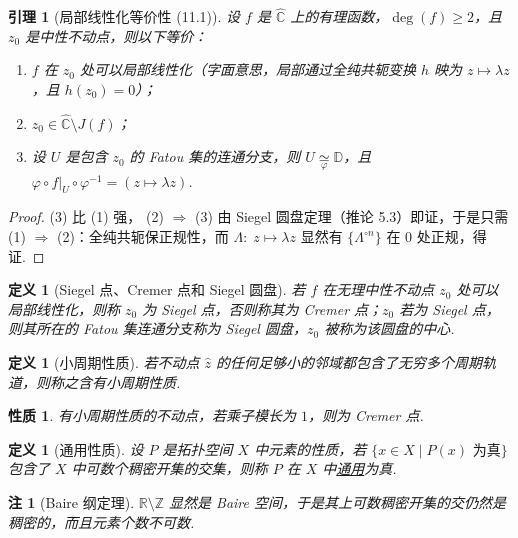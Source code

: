 \documentclass[11pt, a4paper, oneside]{ctexart}
\newtheorem{definition}[theorem]{定义}
\newtheorem{lemma}[theorem]{引理}
\newtheorem{property}[theorem]{性质}
\newtheorem{remark}[theorem]{注}
\newcommand{\C}{\mathbb{C}}
\newcommand{\D}{\mathbb{D}}
\newcommand{\R}{\mathbb{R}}
\newcommand{\Z}{\mathbb{Z}}
\begin{document}
    \begin{lemma}[局部线性化等价性 (11.1)]\label{引理11.1}
        设 $f$ 是 $\hat{\C}$ 上的有理函数，$\deg(f)\geq 2$，且 $z_0$ 是中性不动点，则以下等价：
        \begin{enumerate}[(1)]
            \item $f$ 在 $z_0$ 处可以局部线性化（字面意思，局部通过全纯共轭变换 $h$ 映为 $z\mapsto \lambda z$，且 $h(z_0)=0$）；
            \item $z_0\in\hat{\C}\setminus J(f)$；
            \item 设 $U$ 是包含 $z_0$ 的 Fatou 集的连通分支，则 $U\mathop{\simeq}\limits_{\varphi}\D$，且 $\varphi\circ f|_U\circ\varphi^{-1}=(z\mapsto\lambda z)$.
        \end{enumerate}
    \end{lemma}
    \begin{proof}
        (3) 比 (1) 强， (2) $\Rightarrow$ (3) 由 Siegel 圆盘定理（推论 5.3）即证，于是只需 (1) $\Rightarrow$ (2)：全纯共轭保正规性，而 $\Lambda:\;z\mapsto \lambda z$ 显然有 $\{\Lambda^{\circ n}\}$ 在 $0$ 处正规，得证.
    \end{proof}

    \begin{definition}[Siegel 点、Cremer 点和 Siegel 圆盘]
        若 $f$ 在无理中性不动点 $z_0$ 处可以局部线性化，则称 $z_0$ 为 Siegel 点，否则称其为 Cremer 点；$z_0$ 若为 Siegel 点，则其所在的 Fatou 集连通分支称为 Siegel 圆盘，$z_0$ 被称为该圆盘的中心.
    \end{definition}

    \begin{definition}[小周期性质]
        若不动点 $\hat{z}$ 的任何足够小的邻域都包含了无穷多个周期轨道，则称之含有小周期性质.
    \end{definition}
    \begin{property}
        有小周期性质的不动点，若乘子模长为 $1$，则为 Cremer 点.
    \end{property}

    \begin{definition}[通用性质]
        设 $P$ 是拓扑空间 $X$ 中元素的性质，若 $\{x\in X\mid P(x)\text{ 为真}\}$ 包含了 $X$ 中可数个稠密开集的交集，则称 $P$ 在 $X$ 中\underline{通用}为真.
    \end{definition}

    \begin{remark}[Baire 纲定理]
        $\R\setminus\Z$ 显然是 Baire 空间，于是其上可数稠密开集的交仍然是稠密的，而且元素个数不可数.
    \end{remark}
\end{document}
